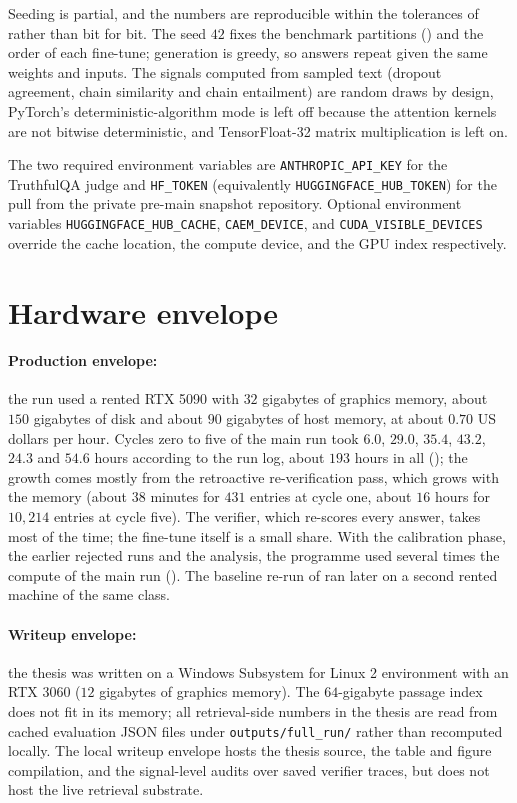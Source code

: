 Seeding is partial, and the numbers are reproducible within the tolerances of  rather than bit for bit. The seed $42$ fixes the benchmark partitions () and the order of each fine-tune; generation is greedy, so answers repeat given the same weights and inputs. The signals computed from sampled text (dropout agreement, chain similarity and chain entailment) are random draws by design, PyTorch's deterministic-algorithm mode is left off because the attention kernels are not bitwise deterministic, and TensorFloat-32 matrix multiplication is left on.

The two required environment variables are \verb|ANTHROPIC_API_KEY| for the TruthfulQA judge and \verb|HF_TOKEN| (equivalently \verb|HUGGINGFACE_HUB_TOKEN|) for the pull from the private pre-main snapshot repository. Optional environment variables \verb|HUGGINGFACE_HUB_CACHE|, \verb|CAEM_DEVICE|, and \verb|CUDA_VISIBLE_DEVICES| override the cache location, the compute device, and the GPU index respectively.

\section{Hardware envelope}
\label{app:repro-hardware}

\paragraph{Production envelope:} the run used a rented RTX 5090 with $32$ gigabytes of graphics memory, about $150$ gigabytes of disk and about $90$ gigabytes of host memory, at about $0.70$ US dollars per hour. Cycles zero to five of the main run took $6.0$, $29.0$, $35.4$, $43.2$, $24.3$ and $54.6$ hours according to the run log, about $193$ hours in all (); the growth comes mostly from the retroactive re-verification pass, which grows with the memory (about $38$ minutes for $431$ entries at cycle one, about $16$ hours for $10{,}214$ entries at cycle five). The verifier, which re-scores every answer, takes most of the time; the fine-tune itself is a small share. With the calibration phase, the earlier rejected runs and the analysis, the programme used several times the compute of the main run (). The baseline re-run of  ran later on a second rented machine of the same class.

\paragraph{Writeup envelope:} the thesis was written on a Windows Subsystem for Linux 2 environment with an RTX 3060 ($12$ gigabytes of graphics memory). The $64$-gigabyte passage index does not fit in its memory; all retrieval-side numbers in the thesis are read from cached evaluation JSON files under \verb|outputs/full_run/| rather than recomputed locally. The local writeup envelope hosts the thesis source, the table and figure compilation, and the signal-level audits over saved verifier traces, but does not host the live retrieval substrate.

